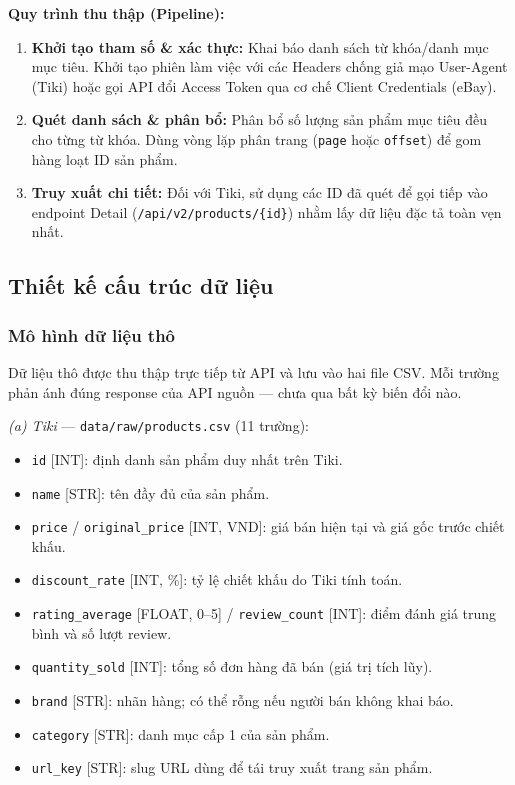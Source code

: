 \textbf{Quy trình thu thập (Pipeline):}
\begin{enumerate}
    \item \textbf{Khởi tạo tham số \& xác thực:} Khai báo danh sách từ khóa/danh mục mục tiêu. Khởi tạo phiên làm việc với các Headers chống giả mạo User-Agent (Tiki) hoặc gọi API đổi Access Token qua cơ chế Client Credentials (eBay).
    \item \textbf{Quét danh sách \& phân bổ:} Phân bổ số lượng sản phẩm mục tiêu đều cho từng từ khóa. Dùng vòng lặp phân trang (\texttt{page} hoặc \texttt{offset}) để gom hàng loạt ID sản phẩm.
    \item \textbf{Truy xuất chi tiết:} Đối với Tiki, sử dụng các ID đã quét để gọi tiếp vào endpoint Detail (\texttt{/api/v2/products/\{id\}}) nhằm lấy dữ liệu đặc tả toàn vẹn nhất.
\end{enumerate}

\subsection{Thiết kế cấu trúc dữ liệu}

\subsubsection{Mô hình dữ liệu thô}

Dữ liệu thô được thu thập trực tiếp từ API và lưu vào hai file CSV. Mỗi trường phản ánh đúng response của API nguồn — chưa qua bất kỳ biến đổi nào.

\textit{(a) Tiki} — \texttt{data/raw/products.csv} (11 trường):
\begin{itemize} [leftmargin=1.5cm]
    \item \texttt{id} [INT]: định danh sản phẩm duy nhất trên Tiki.
    \item \texttt{name} [STR]: tên đầy đủ của sản phẩm.
    \item \texttt{price} / \texttt{original\_price} [INT, VND]: giá bán hiện tại và giá gốc trước chiết khấu.
    \item \texttt{discount\_rate} [INT, \%]: tỷ lệ chiết khấu do Tiki tính toán.
    \item \texttt{rating\_average} [FLOAT, 0--5] / \texttt{review\_count} [INT]: điểm đánh giá trung bình và số lượt review.
    \item \texttt{quantity\_sold} [INT]: tổng số đơn hàng đã bán (giá trị tích lũy).
    \item \texttt{brand} [STR]: nhãn hàng; có thể rỗng nếu người bán không khai báo.
    \item \texttt{category} [STR]: danh mục cấp 1 của sản phẩm.
    \item \texttt{url\_key} [STR]: slug URL dùng để tái truy xuất trang sản phẩm.
\end{itemize}

